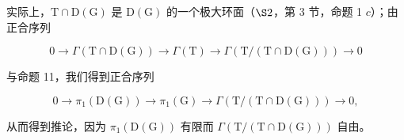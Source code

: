实际上，\(\mathrm{T} \cap \mathrm{D}(\mathrm{G})\) 是 \(\mathrm{D}(\mathrm{G})\) 的一个极大环面（\(\S 2\)，第 3 节，命题 1 \(c\)）；由正合序列

\[
0 \longrightarrow \Gamma (\mathrm{T} \cap \mathrm{D} (\mathrm{G})) \longrightarrow \Gamma (\mathrm{T}) \longrightarrow \Gamma (\mathrm{T} / (\mathrm{T} \cap \mathrm{D} (\mathrm{G}))) \longrightarrow 0
\]

与命题 11，我们得到正合序列

\[
0 \longrightarrow \pi_ {1} (\mathrm{D} (\mathrm{G})) \longrightarrow \pi_ {1} (\mathrm{G}) \longrightarrow \Gamma (\mathrm{T} / (\mathrm{T} \cap \mathrm{D} (\mathrm{G}))) \longrightarrow 0,
\]

从而得到推论，因为 \(\pi_{1}(\mathrm{D}(\mathrm{G}))\) 有限而 \(\Gamma(\mathrm{T}/(\mathrm{T}\cap\mathrm{D}(\mathrm{G})))\) 自由。

